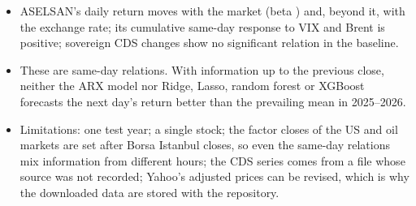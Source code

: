 \documentclass[11pt,a4paper]{article}
\begin{document}
\begin{itemize}
  \item ASELSAN's daily return moves with the market (beta \BetaBist) and, beyond it, with the exchange rate; its cumulative
  same-day response to VIX and Brent is positive; sovereign CDS changes show no significant relation in the baseline.
  \item These are same-day relations. With information up to the previous close, neither the ARX model nor Ridge, Lasso, random
  forest or XGBoost forecasts the next day's return better than the prevailing mean in 2025--2026.
  \item Limitations: one test year; a single stock; the factor closes of the US and oil markets are set after Borsa Istanbul
  closes, so even the same-day relations mix information from different hours; the CDS series comes from a file whose source was not
  recorded; Yahoo's adjusted prices can be revised, which is why the downloaded data are stored with the repository.
\end{itemize}
\end{document}
